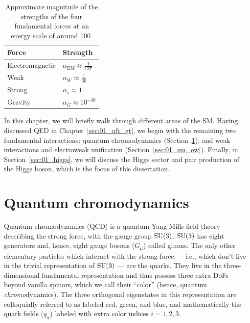 \begin{table}[htbp]
    \centering
	\renewcommand{\arraystretch}{1.5}
    \begin{tabular}{ll}
        \toprule
        \textbf{Force} & \textbf{Strength}\\
        \midrule
        Electromagnetic &
        $\alpha_\mathrm{EM} \approx \frac{1}{137}$ \\
        Weak &
        $\alpha_W \approx \frac{1}{30}$\\
        Strong &
        $\alpha_s \approx 1$\\
        Gravity &
        $\alpha_G  \approx 10^{-38}$\\
        \bottomrule
    \end{tabular}
	\vspace{5mm}
	\caption{Approximate magnitude of the strengths of the four fundamental forces at an energy scale of around 100\MeV.}
	\label{tab:01_sm_coupling_constants}
\end{table}

In this chapter, we will briefly walk through different areas of the SM.
Having discussed QED in Chapter~\ref{sec:01_qft_gt}, we begin with the remaining two fundamental interactions: quantum chromodynamics (Section~\ref{sec:01_sm_qcd}); and weak interactions and electroweak unification (Section~\ref{sec:01_sm_ew}).
Finally, in Section~\ref{sec:01_higgs}, we will discuss the Higgs sector and pair production of the Higgs boson, which is the focus of this dissertation.


\section{Quantum chromodynamics}
\label{sec:01_sm_qcd}

Quantum chromodynamics (QCD) is a quantum Yang-Mills field theory describing the strong force, with the gauge group $\SU[3]$.
$\SU[3]$ has eight generators and, hence, eight gauge bosons ($G_\mu$) called gluons.
The only other elementary particles which interact with the strong force --- i.e., which don't live in the trivial representation of $\SU[3]$ --- are the quarks.
They live in the three-dimensional fundamental representation and thus possess three extra DoFs beyond vanilla spinors, which we call their ``color'' (hence, quantum \textit{chromo}dynamics).
The three orthogonal eigenstates in this representation are colloquially referred to as labeled red, green, and blue, and mathematically the quark fields ($q_\alpha$) labeled with extra color indices $i = 1, 2, 3$.

